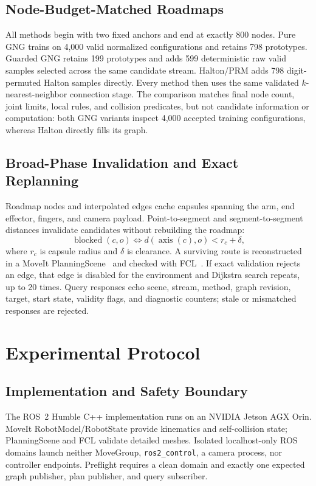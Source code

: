 \documentclass[letterpaper,10pt,conference]{ieeeconf}
\begin{document}
\subsection{Node-Budget-Matched Roadmaps}
All methods begin with two fixed anchors and end at exactly 800 nodes. Pure GNG trains on 4,000 valid normalized configurations and retains 798 prototypes. Guarded GNG retains 199 prototypes and adds 599 deterministic raw valid samples selected across the same candidate stream. Halton/PRM adds 798 digit-permuted Halton samples directly. Every method then uses the same validated $k$-nearest-neighbor connection stage. The comparison matches final node count, joint limits, local rules, and collision predicates, but not candidate information or computation: both GNG variants inspect 4,000 accepted training configurations, whereas Halton directly fills its graph.

\subsection{Broad-Phase Invalidation and Exact Replanning}
Roadmap nodes and interpolated edges cache capsules spanning the arm, end effector, fingers, and camera payload. Point-to-segment and segment-to-segment distances invalidate candidates without rebuilding the roadmap:
\begin{equation}
\operatorname{blocked}(c,o)\iff d(\operatorname{axis}(c),o)<r_c+\delta,
\label{eq:block}
\end{equation}
where $r_c$ is capsule radius and $\delta$ is clearance. A surviving route is reconstructed in a MoveIt PlanningScene~\cite{coleman2014} and checked with FCL~\cite{pan2012}. If exact validation rejects an edge, that edge is disabled for the environment and Dijkstra search repeats, up to 20 times. Query responses echo scene, stream, method, graph revision, target, start state, validity flags, and diagnostic counters; stale or mismatched responses are rejected.

\section{Experimental Protocol}
\subsection{Implementation and Safety Boundary}
The ROS~2 Humble C++ implementation runs on an NVIDIA Jetson AGX Orin. MoveIt RobotModel/RobotState provide kinematics and self-collision state; PlanningScene and FCL validate detailed meshes. Isolated localhost-only ROS domains launch neither MoveGroup, \texttt{ros2\_control}, a camera process, nor controller endpoints. Preflight requires a clean domain and exactly one expected graph publisher, plan publisher, and query subscriber.
\end{document}
